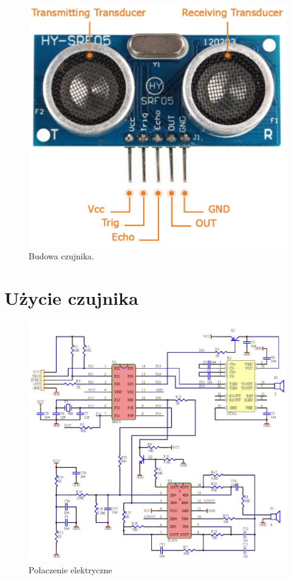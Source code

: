 \documentclass[11pt, a4paper]{article}
\begin{document}
\vspace{0.5cm}
\begin{figure}[h]
\centering
\includegraphics[width=.65\linewidth]{fig/element/fig3.png}
\caption{Budowa czujnika.\cite{fot3}}
\label{fig:test}
\end{figure}
\vspace{0.5cm}

\newpage
\section{Użycie czujnika}

\vspace{0.5cm}
\begin{figure}[h!]
    \centering
    \includegraphics[width=\linewidth]{fig/element/SRFkicad.png}
    \caption{Połaczenie elektryczne}
    \label{fig:my_label}
\end{figure}
\vspace{0.5cm}
\end{document}
